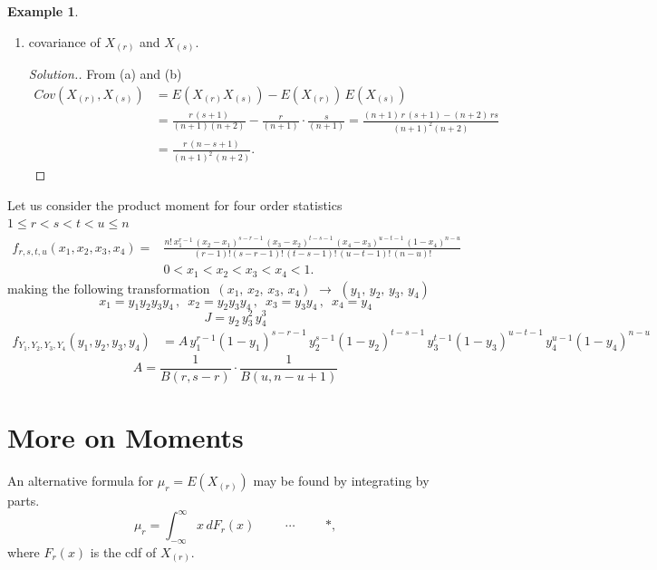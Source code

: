 \documentclass[12pt,a4paper]{report}
\theoremstyle{definition}
\newtheorem{exa}[thm]{Example}
\theoremstyle{plain}
\begin{document}
\begin{exa}
\begin{enumerate}
\item[(c)] covariance of $X_{(r)}$ and $X_{(s)}$.
\begin{proof}[Solution.]
From (a) and (b)
\begin{align*}
Cov\left(X_{(r)}, X_{(s)}\right)  &  = E\left(X_{(r)}X_{(s)}\right) - E\left(X_{(r)}\right)\, E\left(X_{(s)}\right)\\
& = \frac{r\, (s + 1)}{(n + 1)(n + 2)} - \frac{r}{(n + 1)}\cdot\frac{s}{(n+1)}
= \frac{(n + 1)\, r\, (s  + 1) - (n + 2)\, rs}{(n + 1)^2(n + 2)}\\
& = \frac{r\, (n - s + 1)}{(n + 1)^2\, (n + 2)}.
\end{align*}
\end{proof}
\end{enumerate}
\end{exa}



Let us consider the product moment for four order statistics
$1 \leq r < s < t < u \leq n$
\begin{align*}
f_{r,s,t,u}(x_1, x_2, x_3, x_4)  = & \frac{n!\, x_1^{r - 1}\, (x_2 - x_1)^{s - r - 1}\, (x_3 -x_2)^{t-s-1}\, (x_4 - x_3)^{u -t - 1}\, (1 - x_4)^{n - u}}{(r - 1)!(s - r - 1)!\, (t - s - 1)!\, (u - t - 1)!\, (n - u)!}\\
 & 0 < x_1 < x_2 < x_3 < x_4 < 1.
\end{align*}
making the following transformation
$\,(x_1,\,  x_2,\, x_3,\, x_4)\, \, \longrightarrow\, \, (y_1,\, y_2,\, y_3, \, y_4)$
$$x_1 = y_1y_2y_3y_4\, , \,\,\,  x_2 = y_2y_3y_4\, , \,\,\,  x_3 = y_3y_4\, , \,\,\, x_4 = y_4$$
$$J = y_2\, y_3^2\, y_4^3$$
\begin{align*}
f_{Y_1,Y_2,Y_3,Y_4}(y_1,y_2,y_3,y_4) & =A\, y_1^{r - 1}(1 - y_1)^{s - r - 1}\, y^{s  - 1}_2(1 - y_2)^{t - s - 1}\,y^{t - 1}_3(1 - y_3)^{u - t - 1}\, y_4^{u - 1}(1 - y_4)^{n - u}
\end{align*}
$$A = \frac{1}{B(r,s - r)}\cdot\frac{1}{B(u, n - u + 1)}$$





\section{More on Moments}
An alternative formula for $\mu_r = E(X_{(r)})$ may be found by integrating by parts.
$$\mu_r = \int^{\infty}_{-\infty} x\, dF_r(x)\hspace{1cm} \cdots\hspace{1cm} *,$$
where $F_r(x)$ is the cdf of $X_{(r)}$.\\
\end{document}

